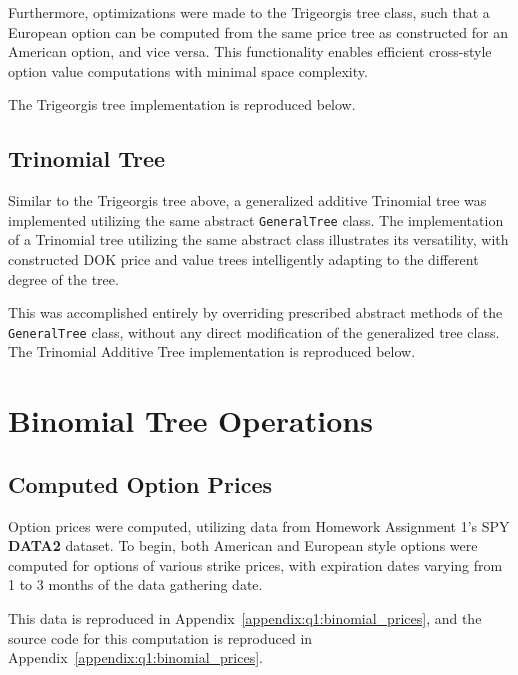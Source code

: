 \documentclass[10pt]{article}
\begin{document}
    Furthermore, optimizations were made to the Trigeorgis tree class, such that a European option can be computed from the same price tree as constructed for an American option, and vice versa. This functionality enables efficient cross-style option value computations with minimal space complexity.

    The Trigeorgis tree implementation is reproduced below.

        

    \newpage
    \subsection{Trinomial Tree}

    
    Similar to the Trigeorgis tree above, a generalized additive Trinomial tree was implemented utilizing the same abstract \texttt{GeneralTree} class. The implementation of a Trinomial tree utilizing the same abstract class illustrates its versatility, with constructed DOK price and value trees intelligently adapting to the different degree of the tree.
    
    This was accomplished entirely by overriding prescribed abstract methods of the \texttt{GeneralTree} class, without any direct modification of the generalized tree class. The Trinomial Additive Tree implementation is reproduced below.

    
    
\newpage
\section{Binomial Tree Operations}

    \subsection{Computed Option Prices}

    Option prices were computed, utilizing data from Homework Assignment 1's SPY \textbf{DATA2} dataset. To begin, both American and European style options were computed for options of various strike prices, with expiration dates varying from 1 to 3 months of the data gathering date.

    This data is reproduced in Appendix~\ref{appendix:q1:binomial_prices}, and the source code for this computation is reproduced in Appendix~\ref{appendix:q1:binomial_prices}.
\end{document}
